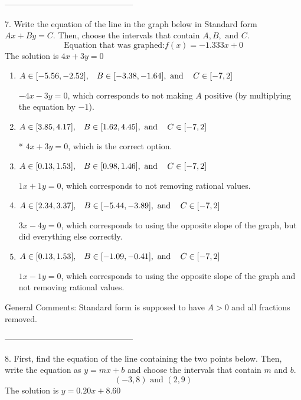 \documentclass{extbook}[14pt]
\begin{document}
-----------------------------------------------

7. Write the equation of the line in the graph below in Standard form $Ax+By=C$. Then, choose the intervals that contain $A, B, \text{ and } C$.
\[ \text{Equation that was graphed:} f(x)= -1.333 x + 0 \] 
The solution is $ 4 x + 3 y = 0 $ 

\begin{enumerate}[label=\Alph*.] 
\item $ A \in [-5.56, -2.52], \hspace{3mm} B \in [-3.38, -1.64], \text{ and } \hspace{3mm} C \in [-7, 2] $ 

  $-4x - 3y = 0$, which corresponds to not making $A$ positive (by multiplying the equation by $-1$). 
\item $ A \in [3.85, 4.17], \hspace{3mm} B \in [1.62, 4.45], \text{ and } \hspace{3mm} C \in [-7, 2] $ 

 * $4x + 3y = 0$, which is the correct option. 
\item $ A \in [0.13, 1.53], \hspace{3mm} B \in [0.98, 1.46], \text{ and } \hspace{3mm} C \in [-7, 2] $ 

  $1x + 1y = 0$, which corresponds to not removing rational values. 
\item $ A \in [2.34, 3.37], \hspace{3mm} B \in [-5.44, -3.89], \text{ and } \hspace{3mm} C \in [-7, 2] $ 

  $3x - 4y = 0$, which corresponds to using the opposite slope of the graph, but did everything else correctly. 
\item $ A \in [0.13, 1.53], \hspace{3mm} B \in [-1.09, -0.41], \text{ and } \hspace{3mm} C \in [-7, 2] $ 

  $1x - 1y = 0$, which corresponds to using the opposite slope of the graph and not removing rational values. 
\end{enumerate} 
 
General Comments: Standard form is supposed to have $A > 0$ and all fractions removed.

-----------------------------------------------

8. First, find the equation of the line containing the two points below. Then, write the equation as $ y=mx+b $ and choose the intervals that contain $m$ and $b$.
\[ (-3, 8) \text{ and } (2, 9) \] 
The solution is $ y = 0.20x + 8.60 $ 
\end{document}
